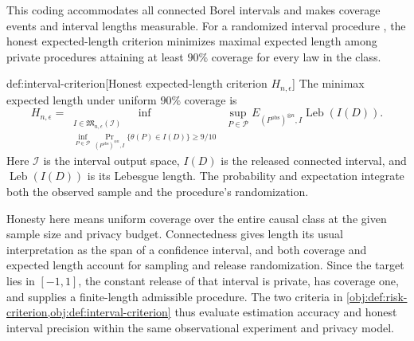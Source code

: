 This coding accommodates all connected Borel intervals and makes coverage events and interval lengths measurable. For a randomized interval procedure , the honest expected-length criterion  minimizes maximal expected length among private procedures attaining at least \(90\%\) coverage for every law in the class.

\begin{definitionv}{def:interval-criterion}[Honest expected-length criterion \(H_{n,\epsilon}\)]
The minimax expected length under uniform \(90\%\) coverage is
\[
H_{n,\epsilon}
=
\inf_{\substack{
I\in\mathfrak M_{n,\epsilon}(\mathcal I)\\
\inf_{P\in\mathcal P}
\Pr_{(P^{\mathrm{obs}})^{\otimes n},I}
\{\theta(P)\in I(D)\}\ge 9/10
}}
\ \sup_{P\in\mathcal P}
E_{(P^{\mathrm{obs}})^{\otimes n},I}
\operatorname{Leb}(I(D)).
\]
Here \(\mathcal I\) is the interval output space, \(I(D)\) is the released connected interval, and \(\operatorname{Leb}(I(D))\) is its Lebesgue length. The probability and expectation integrate both the observed sample and the procedure's randomization.
\end{definitionv}

Honesty here means uniform coverage over the entire causal class at the given sample size and privacy budget. Connectedness gives length its usual interpretation as the span of a confidence interval, and both coverage and expected length account for sampling and release randomization. Since the target lies in \([-1,1]\), the constant release of that interval is private, has coverage one, and supplies a finite-length admissible procedure. The two criteria in \cref{obj:def:risk-criterion,obj:def:interval-criterion} thus evaluate estimation accuracy and honest interval precision within the same observational experiment and privacy model.
